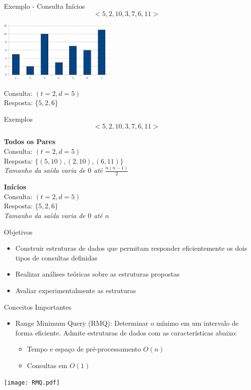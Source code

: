 \documentclass{beamer}
\begin{document}
\begin{frame}{Exemplo - Consulta Inícios}
$$<5, 2, 10, 3, 7, 6, 11>$$
\begin{center}
\includegraphics[height=3.0cm]{g0.jpg}
\end{center}
Consulta: $(t = 2, d = 5)$
\\
Resposta: \{$5, 2, 6$\}
\end{frame}

\begin{frame}{Exemplos}
$$<5, 2, 10, 3, 7, 6, 11>$$

\textbf{Todos os Pares}\\
Consulta: $(t = 2, d = 5)$\\
Resposta: $\{(5, 10), (2, 10), (6, 11)\}$\\
\textit{Tamanho da saída varia de $0$ até $\frac{n(n-1)}{2}$}
\bigskip

\textbf{Inícios}\\
Consulta: $(t = 2, d = 5)$\\
Resposta: $\{5, 2, 6\}$\\
\textit{Tamanho da saída varia de $0$ até $n$}
\end{frame}

\begin{frame}{Objetivos}
\begin{itemize}
\item Construir estruturas de dados que permitam responder eficientemente
			os dois tipos de consultas definidas
\item Realizar análises teóricas sobre as estruturas propostas
\item Avaliar experimentalmente as estruturas
\end{itemize}
\end{frame}

\begin{frame}{Conceitos Importantes}
\begin{itemize}
\item
Range Minimum Query (RMQ): Determinar o mínimo em um intervalo
de forma eficiente. Admite estruturas de dados com as características
abaixo:
\begin{itemize}
	\item Tempo e espaço de pré-processamento $O(n)$
	\item Consultas em $O(1)$
\end{itemize}
\end{itemize}
\begin{center}
\texttt{[image: RMQ.pdf]}
\end{center}

\end{frame}
\end{document}
